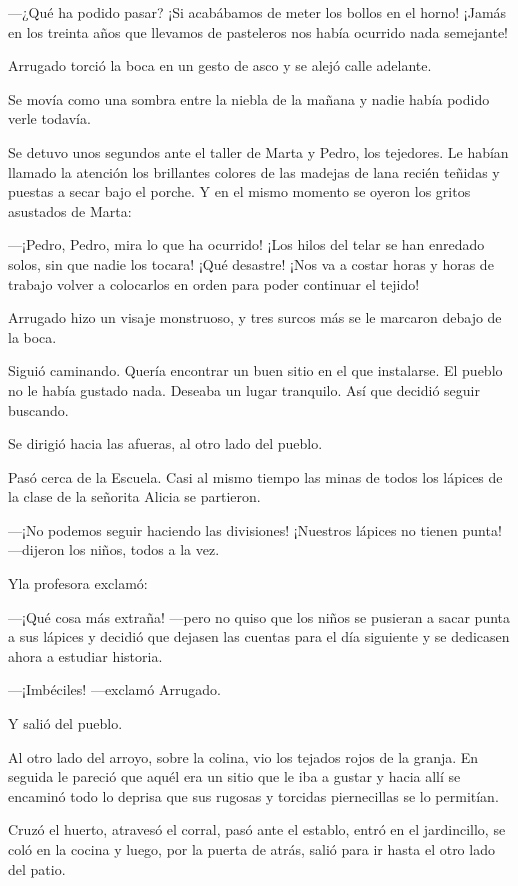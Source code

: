\documentclass{barcodevapor3pags}
\begin{document}
---¿Qué ha podido pasar? ¡Si acabábamos de meter los bollos en el horno!
¡Jamás en los treinta años que llevamos de pasteleros nos había ocurrido
nada semejante!

Arrugado torció la boca en un gesto de asco y se alejó calle adelante.

Se movía como una sombra entre la niebla de la mañana y nadie había
podido verle todavía.

Se detuvo unos segundos ante el taller de Marta y Pedro, los tejedores.
Le habían llamado la atención los brillantes colores de las madejas de
lana recién teñidas y puestas a secar bajo el porche. Y en el mismo
momento se oyeron los gritos asustados de Marta:

---¡Pedro, Pedro, mira lo que ha ocurrido! ¡Los hilos del telar se han
enredado solos, sin que nadie los tocara! ¡Qué desastre! ¡Nos va a
costar horas y horas de trabajo volver a colocarlos en orden para poder
continuar el tejido!

Arrugado hizo un visaje monstruoso, y tres surcos más se le marcaron
debajo de la boca.

Siguió caminando. Quería encontrar un buen sitio en el que instalarse.
El pueblo no le había gustado nada. Deseaba un lugar tranquilo. Así que
decidió seguir buscando.

Se dirigió hacia las afueras, al otro lado del pueblo.

Pasó cerca de la Escuela. Casi al mismo tiempo las minas de todos los
lápices de la clase de la señorita Alicia se partieron.

---¡No podemos seguir haciendo las divisiones! ¡Nuestros lápices no
tienen punta! ---dijeron los niños, todos a la vez.

Yla profesora exclamó:

---¡Qué cosa más extraña! ---pero no quiso que los niños se pusieran a
sacar punta a sus lápices y decidió que dejasen las cuentas para el día
siguiente y se dedicasen ahora a estudiar historia.

---¡Imbéciles! ---exclamó Arrugado.

Y salió del pueblo.

Al otro lado del arroyo, sobre la colina, vio los tejados rojos de la
granja. En seguida le pareció que aquél era un sitio que le iba a gustar
y hacia allí se encaminó todo lo deprisa que sus rugosas y torcidas
piernecillas se lo permitían.

Cruzó el huerto, atravesó el corral, pasó ante el establo, entró en el
jardincillo, se coló en la cocina y luego, por la puerta de atrás, salió
para ir hasta el otro lado del patio.
\end{document}
